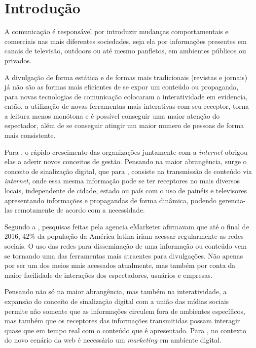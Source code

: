 \documentclass[
	12pt,				%
	openright,			%
	oneside,			%
	a4paper,			%
	english,			%
	french,				%
	spanish,			%
	brazil,				%
	]{abntex2}
\begin{document}
\frenchspacing 
\imprimircapa
\imprimirfolhaderosto*



\section*{Introdução}
	A comunicação é responsável por introduzir mudanças comportamentais e comerciais nas mais diferentes sociedades, seja ela por informações presentes em canais de televisão, outdoors ou até mesmo panfletos, em ambientes públicos ou privados.
	
	A divulgação de forma estática e de formas mais tradicionais (revistas e jornais) já não são as formas mais eficientes de se expor um conteúdo ou propaganda, para \cite{escobar2007} novas tecnologias de comunicação colocaram a interatividade em evidencia, então,  a utilização de novas ferramentas mais interativas com seu receptor, torna a leitura menos monótona e é possível conseguir uma maior atenção do espectador, além de se conseguir atingir um maior numero de pessoas de forma mais consistente.
	
	Para \cite{machado2010}, o rápido crescimento das organizações juntamente com a \textit{internet} obrigou elas a aderir novos conceitos de gestão. Pensando na maior abrangência, surge o conceito de sinalização digital, que para \cite{machado2010}, consiste na transmissão de conteúdo via \textit{internet},  onde essa mesma informação pode se ter receptores no mais diversos locais, independente de cidade, estado ou país com o uso de painéis e televisores apresentando informações e propagandas de forma dinâmica, podendo gerencia-las remotamente de acordo com a necessidade.
	
	Segundo a \cite{forbes2016}, pesquisas feitas pela agencia eMarketer afirmavam que até o final de 2016, 42\% da população da América latina iriam acessar regularmente as redes sociais. O uso das redes para disseminação de uma informação ou conteúdo vem se tornando uma das ferramentas mais atraentes para divulgações. Não apenas por ser um dos meios mais acessados atualmente, mas também por conta da maior facilidade de interações dos espectadores, usuários e empresas.
	
	Pensando não só na maior abrangência, mas também na interatividade, a expansão do conceito de sinalização digital com a união das mídias sociais permite não somente que as informações circulem fora de ambientes específicos, mas também que os receptores das informações transmitidas possam interagir quase que em tempo real com o conteúdo que é apresentado. Para \cite{santos2014}, no contexto do novo cenário da web é necessário um \textit{marketing} em ambiente digital. 
	
\end{document}
